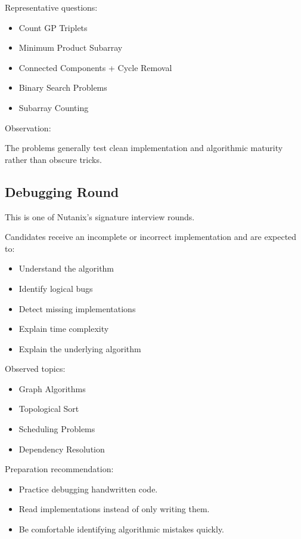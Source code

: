 \documentclass[11pt,a4paper]{article}
\begin{document}
Representative questions:

\begin{itemize}
	\item Count GP Triplets
	\item Minimum Product Subarray
	\item Connected Components + Cycle Removal
	\item Binary Search Problems
	\item Subarray Counting
\end{itemize}

Observation:

The problems generally test clean implementation and algorithmic maturity rather than obscure tricks.


\subsection{Debugging Round}

This is one of Nutanix's signature interview rounds.

Candidates receive an incomplete or incorrect implementation and are expected to:

\begin{itemize}
	\item Understand the algorithm
	\item Identify logical bugs
	\item Detect missing implementations
	\item Explain time complexity
	\item Explain the underlying algorithm
\end{itemize}

Observed topics:

\begin{itemize}
	\item Graph Algorithms
	\item Topological Sort
	\item Scheduling Problems
	\item Dependency Resolution
\end{itemize}

Preparation recommendation:

\begin{itemize}
	\item Practice debugging handwritten code.
	\item Read implementations instead of only writing them.
	\item Be comfortable identifying algorithmic mistakes quickly.
\end{itemize}
\end{document}
